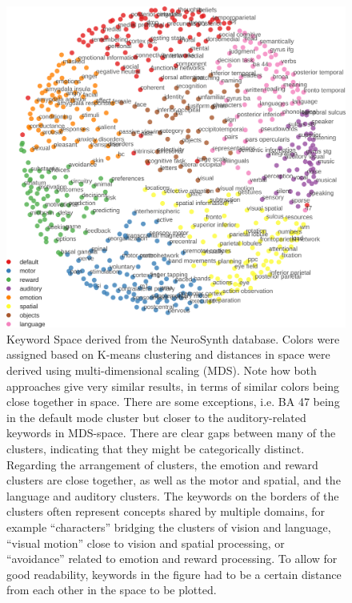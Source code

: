\documentclass[fleqn,10pt]{SelfArx} %
\begin{document}
\begin{figure}[htbp]
	\begin{minipage}{\textwidth}
		\renewcommand{\familydefault}{\sfdefault}\normalfont
		\centering
		\includegraphics[width=\columnwidth]{./figs/fig1_nsBallSparse.png}
				\vspace*{-3mm}
		\caption{Keyword Space derived from the NeuroSynth database. Colors were assigned based on K-means clustering and distances in space were derived using multi-dimensional scaling (MDS). Note how both approaches give very similar results, in terms of similar colors being close together in space. There are some exceptions, i.e. BA 47 being in the default mode cluster but closer to the auditory-related keywords in MDS-space. There are clear gaps between many of the clusters, indicating that they might be categorically distinct. Regarding the arrangement of clusters, the emotion and reward clusters are close together, as well as the motor and spatial, and the language and auditory clusters. The keywords on the borders of the clusters often represent concepts shared by multiple domains, for example “characters” bridging the clusters of vision and language, “visual motion” close to vision and spatial processing, or “avoidance” related to emotion and reward processing. To allow for good readability, keywords in the figure had to be a certain distance from each other in the space to be plotted.}%
		\label{fig:nsBall}
	\end{minipage}
\end{figure}
\end{document}
